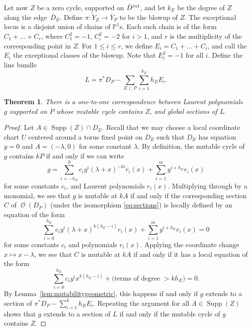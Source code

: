 \documentclass[11pt]{article}
\numberwithin{equation}{section}
\newtheorem{Theorem}{Theorem}[section]
\DeclareMathOperator{\Supp}{{Supp}}
\DeclareMathOperator{\cO}{\mathcal{O}}
\newcommand{\PP}{\mathbb{P}}
\begin{document}
Let now $Z$ be a zero cycle, supported on $\bar{D}^{\rm int}$, and let $k_E$ be the degree of $Z$ along the edge~$\bar{D}_E$.
Define $\pi \colon \tilde{Y}_Z \rightarrow \bar{Y}_P$ to be the blowup of $Z$. The exceptional locus is a disjoint union of chains of $\PP^1$s. Each such chain is of the form $C_1+\dots +C_r$, where $C_1^2=-1$, $C_i^2=-2$ for $i>1$, and $r$ is the multiplicity of the corresponding point in $Z$. For $1 \leq i \leq r$, we define $E_i=C_1+\dots+C_i$, and call the $E_i$ the exceptional classes of the blowup. Note that $E_i^2=-1$ for all $i$. Define the line bundle
\[
L=\pi^*D_P-\sum_{E\subset P} \sum_{i=1}^{k_E} h_EE_i.
\]
	\begin{Theorem}\label{thm:MMLPassections}
There is a one-to-one correspondence between Laurent polynomials $g$ supported on $P$ whose mutable cycle contains $Z$, and global sections of $L$.
\end{Theorem}
\begin{proof}
	Let $A \in \Supp(Z) \cap D_E$. Recall that we may choose a local coordinate chart $U$ centered around a torus fixed point on $D_E$ such that $D_E$ has equation $y=0$ and $A=(-\lambda, 0)$ for some constant $\lambda$. By definition, the mutable cycle of $g$ contains $kP$ if and only if we can write
	\[
	g=	
	\sum_{i=-h_E}^{0}c_i{y^{i}}(\lambda+x)^{-ki}{r}_{i}(x)+\sum_{i=1}^m {y^{i+h_E}}{r}_i(x)
	\]
	for some constants $c_i$, and Laurent polynomials $r_i(x)$.
	Multiplying through by a monomial, we see that $g$ is mutable at $kA$ if and only if the corresponding section $C$ of $\cO(D_P)$ (under the isomorphism \eqref{eq:sections}) is locally defined by an equation of the form
	\[	
	\sum_{i=0}^{h_E}c_i{y^{i}}(\lambda+x)^{k(h_E-i)}{r}_{i}(x)+\sum_{i=1}^m {y^{i+h_E}}{r}_i(x)=0
	\]
	for some constants $c_i$ and polynomials $r_i(x)$.
	Applying the coordinate change $x \mapsto x-\lambda$, we see that $C$ is mutable at $kA$ if and only if it has a local equation of the form
	\[	
	\sum_{i=0}^{h_E}c_i{y^{i}}x^{k(h_E-i)}+\text{(terms of degree $>kh_E$)}=0.
	\]
	By Lemma~\ref{lem:mutabilitygeometric}, this happens if and only if $g$ extends to a section of $\pi^*D_P-\sum_{i=1}^k h_E E_i$. Repeating the argument for all $A \in \Supp(Z)$ shows that $g$ extends to a section of $L$ if and only if the mutable cycle of $g$ contains $Z$.
	\end{proof}
\end{document}
